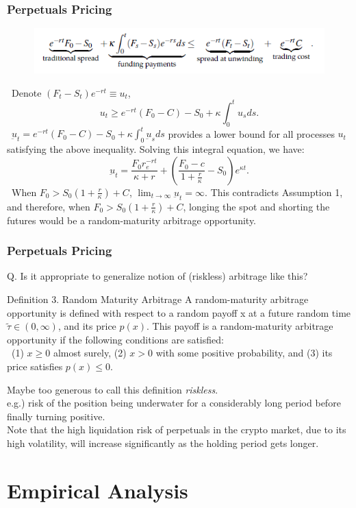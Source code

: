 \documentclass{beamer}
\begin{document}
\begin{frame}
\frametitle{Perpetuals Pricing}
\begin{figure}
\includegraphics[scale=0.95]{figs/Equation(2).png}
\end{figure}
~Denote $(F_t-S_t)e^{-rt}\equiv u_t$, $$u_t\geq e^{-rt}(F_0-C)-S_0+\kappa\int_0^t u_sds.$$
~$\underbar u_t = e^{-rt}(F_0-C)-S_0+\kappa\int^t_0 \underbar u_s ds$ provides a lower bound for all processes $u_t$ satisfying the above inequality. Solving this integral equation, we have: $$\underbar u_t=\frac{F_0r_e^{-rt}}{\kappa+r}+\left(\frac{F_0-c}{1+\frac{r}{\kappa}}-S_0\right)e^{\kappa t}.$$
~When $F_0>S_0(1+\frac{r}{\kappa})+C$, $\lim_{t\to\infty}\underbar u_t=\infty$. This contradicts Assumption 1, and therefore, when $F_0 > S_0(1+\frac{r}{\kappa})+C$, longing the spot and shorting the futures would be a random-maturity arbitrage opportunity.
\end{frame}

\begin{frame}
\frametitle{Perpetuals Pricing}
Q. Is it appropriate to generalize notion of (riskless) arbitrage like this?
\begin{block}{Definition 3. Random Maturity Arbitrage}
A random-maturity arbitrage opportunity is defined with respect to a random payoff x at a \alert{future random time $\tilde\tau \in (0,\infty)$}, and its price $p(x)$. This payoff is a random-maturity arbitrage opportunity if the following conditions are satisfied:\\~(1) $x\geq0$ almost surely, (2) $x>0$ with some positive probability, and (3) its price satisfies $p(x)\leq0$.
\end{block}
Maybe too \alert{generous} to call this definition \textit{riskless}. \\\quad e.g.) risk of the position being underwater for a considerably long period before finally turning positive. \\\quad Note that the high liquidation risk of perpetuals in the crypto market, due to its high volatility, will increase significantly as the holding period gets longer.
~\\
\end{frame}

\section{Empirical Analysis}
\end{document}
